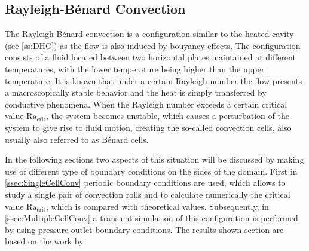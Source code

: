 \subsection{Rayleigh-Bénard Convection}\label{ssec:RayBer}

The Rayleigh-Bénard convection is a configuration similar to the heated cavity (see \cref{ss:DHC}) as the flow is also induced by bouyancy effects. The configuration consists of a fluid located between two horizontal plates maintained at different temperatures, with the lower temperature being higher than the upper temperature. It is known that under a certain Rayleigh number the flow presents a macroscopically stable behavior and the heat is simply transferred by conductive phenomena. When the Rayleigh number exceeds a certain critical value $\text{Ra}_{\text{crit}}$, the system becomes unstable, which causes a perturbation of the system to give rise to fluid motion, creating the so-called convection cells, also usually also referred to as Bénard cells.

In the following sections two aspects of this situation will be discussed by making use of different type of boundary conditions on the sides of the domain. First in \cref{ssec:SingleCellConv} periodic boundary conditions are used, which allows to study a single pair of convection rolls and to calculate numerically the critical value $\text{Ra}_{\text{crit}}$, which is compared with theoretical values. Subsequently, in \cref{ssec:MultipleCellConv} a transient simulation of this configuration is performed by using pressure-outlet boundary conditions. The results shown section are based on the work by \cite{miaoHighOrderSimulationLowMachFlows2022} %

